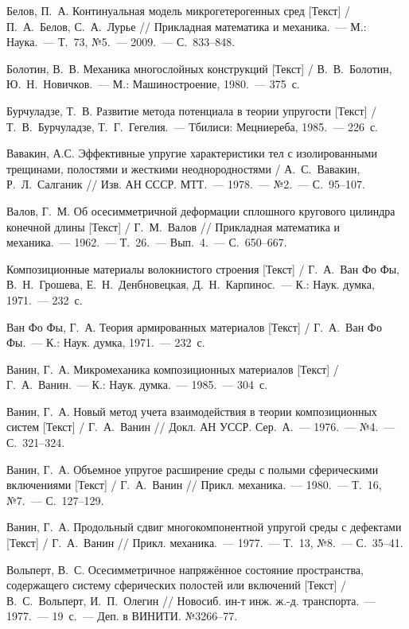 \begin{biblist}{99}
Белов, П.~А. 
Континуальная модель микрогетерогенных сред [Текст] 
/ П.~А.~Белов, С.~А.~Лурье 
// Прикладная математика и механика.~--- М.: Наука.~--- Т.~73, №5.~--- 2009.~--- С.~833--848.

Болотин, В.~В. 
Механика многослойных конструкций [Текст] 
/ В.~В.~Болотин, Ю.~Н.~Новичков.~--- М.: Машиностроение, 1980.~--- 375~с.

Бурчуладзе, Т.~В. 
Развитие метода потенциала в теории упругости [Текст] 
/ Т.~В.~Бурчуладзе, Т.~Г.~Гегелия.~--- Тбилиси: Мецниереба, 1985.~--- 226~с.

Вавакин, А.С. 
Эффективные упругие характеристики тел с изолированными трещинами, полостями и жесткими неоднородностями  
/ А.~С.~Вавакин, Р.~Л.~Салганик 
// Изв. АН СССР. МТТ.~--- 1978.~--- №2.~--- С.~95--107.

Валов, Г.~М. 
Об осесимметричной деформации сплошного кругового цилиндра конечной длины [Текст] 
/ Г.~М.~Валов 
// Прикладная математика и механика.~--- 1962.~--- Т.~26.~--- Вып.~4.~--- С.~650--667.

Композиционные материалы волокнистого строения [Текст] / Г.~А.~Ван Фо Фы, В.~Н.~Грошева, Е.~Н.~Денбновецкая, Д.~Н.~Карпинос.~--- К.: Наук. думка, 1971.~--- 232~с.

Ван Фо Фы, Г.~А. 
Теория армированных материалов [Текст] 
/ Г.~А.~Ван Фо Фы.~--- К.: Наук. думка, 1971.~--- 232~с.

Ванин, Г.~А.
Микромеханика композиционных материалов [Текст] 
/ Г.~А.~Ванин.~--- К.: Наук. думка.~--- 1985.~--- 304~с.

Ванин, Г.~А. 
Новый метод учета взаимодействия в теории композиционных систем [Текст] / Г.~А.~Ванин
// Докл. АН УССР. Сер.~А.~--- 1976.~--- №4.~--- С.~321--324.

Ванин, Г.~А. 
Объемное упругое расширение среды с полыми сферическими включениями [Текст] 
/ Г.~А.~Ванин
// Прикл. механика.~--- 1980.~--- Т.~16, №7.~--- С.~127--129.

Ванин, Г.~А. 
Продольный сдвиг многокомпонентной упругой среды с дефектами [Текст] 
/ Г.~А.~Ванин
// Прикл. механика.~--- 1977.~--- Т.~13, №8.~--- С.~35--41.

Вольперт, В.~С. Осесимметричное напряжённое состояние пространства, содержащего систему сферических полостей или включений [Текст] 
/ В.~С.~Вольперт, И.~П.~Олегин 
// Новосиб. ин-т инж. ж.-д. транспорта.~--- 1977.~--- 19~с.~--- Деп. в ВИНИТИ. №3266--77.


\end{biblist}
